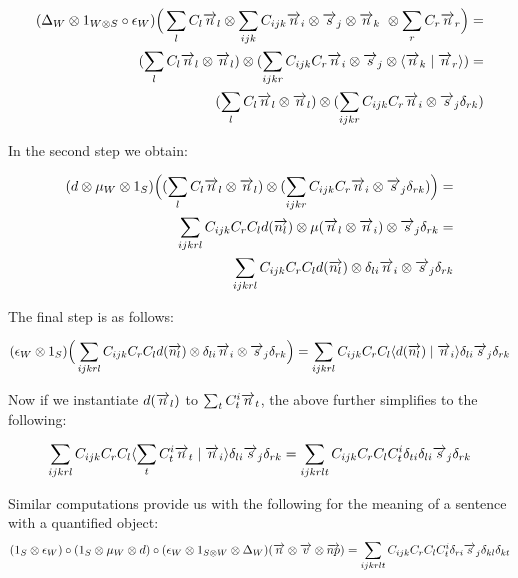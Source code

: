 \begin{align*}
(\Delta_W \otimes 1_{W \otimes S} \circ \epsilon_W)\Big(\sum_l C_l \overrightarrow{n}_l \otimes \sum_{ijk} C_{ijk} \overrightarrow{n}_i \otimes \overrightarrow{s}_j \otimes \overrightarrow{n}_k \ \otimes \sum_r C_r \overrightarrow{n}_r \Big) = \\
(\sum_l C_l \overrightarrow{n}_l \otimes \overrightarrow{n}_l) \otimes  (\sum_{ijkr} C_{ijk} C_r \overrightarrow{n}_i \otimes \overrightarrow{s}_j \otimes \langle \overrightarrow{n}_k \mid \overrightarrow{n}_r \rangle)=\\
(\sum_l C_l \overrightarrow{n}_l \otimes \overrightarrow{n}_l) \otimes  (\sum_{ijkr} C_{ijk} C_r \overrightarrow{n}_i \otimes \overrightarrow{s}_j  \delta_{rk})
\end{align*}

\noindent
In the second step we obtain: 

\begin{align*}
(d \otimes  \mu_W \otimes 1_S)\Big((\sum_l C_l \overrightarrow{n}_l \otimes \overrightarrow{n}_l) \otimes  (\sum_{ijkr} C_{ijk} C_r \overrightarrow{n}_i \otimes \overrightarrow{s}_j  \delta_{rk})\Big) =\\ 
\sum_{ijkrl} C_{ijk}  C_r  C_l d(\overrightarrow{n_l}) \otimes \mu(\overrightarrow{n}_l \otimes \overrightarrow{n}_i) \otimes \overrightarrow{s}_j \delta_{rk}=\\
\sum_{ijkrl} C_{ijk}  C_r  C_l d(\overrightarrow{n_l}) \otimes \delta_{li}\overrightarrow{n}_i \otimes \overrightarrow{s}_j \delta_{rk}
\end{align*}

\noindent
The final step is as follows:

\begin{align*}
(\epsilon_{W} \otimes 1_S) \Big( \sum_{ijkrl} C_{ijk}  C_r  C_l d(\overrightarrow{n_l}) \otimes \delta_{li}\overrightarrow{n}_i \otimes \overrightarrow{s}_j \delta_{rk} \Big) =
\sum_{ijkrl} C_{ijk}  C_r  C_l \langle d(\overrightarrow{n_l}) \mid \overrightarrow{n}_i \rangle  \delta_{li} \overrightarrow{s}_j \delta_{rk}
\end{align*}

\noindent Now if we instantiate $d(\overrightarrow{n}_l)$ to $\sum_t C^i_t \overrightarrow{n}_t$, the above further simplifies to the following:
 
 \[
\sum_{ijkrl} C_{ijk}  C_r  C_l \langle \sum_t C^i_t \overrightarrow{n}_t \mid \overrightarrow{n}_i \rangle  \delta_{li} \overrightarrow{s}_j \delta_{rk}=
\sum_{ijkrlt} C_{ijk}  C_r  C_l C^i_t \delta_{ti}  \delta_{li} \overrightarrow{s}_j \delta_{rk}
\]

\noindent
Similar computations provide us with the following for the meaning of a sentence with a quantified object:
\[
(1_S \otimes \epsilon_W) \circ (1_S \otimes \mu_W \otimes d) \circ (\epsilon_W \otimes 1_{S \otimes W} \otimes \Delta_W)(\overrightarrow{{n}} \otimes \overrightarrow{{v}} \otimes \overrightarrow{{np}}) = \sum_{ijkrlt} C_{ijk} C_r C_l C^i_t \delta_{ri} \overrightarrow{s}_j \delta_{kl} \delta_{kt}
\]

